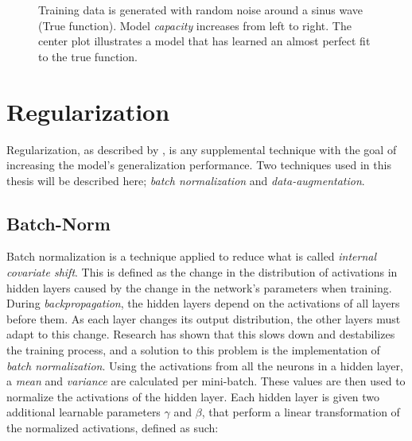         
        \begin{figure}[H]
            \centering
            
            \caption[Over/under-fit]{Training data is generated with random noise around a sinus wave (True function). Model \textit{capacity} increases from left to right. The center plot illustrates a model that has learned an almost perfect fit to the true function.}
          	\medskip 
            \label{over/under fit fig}
        \end{figure}
        
        
\section{Regularization}
    Regularization, as described by \citeauthor{kukavcka2017_regularization}\cite{kukavcka2017_regularization}, is any supplemental technique with the goal of increasing the model's generalization performance. Two techniques used in this thesis will be described here; \textit{batch normalization} and \textit{data-augmentation}.
    
\subsection{Batch-Norm}
    Batch normalization is a technique applied to reduce what is called \textit{internal covariate shift}\cite{pmlr-v37-ioffe15_batch_norm}. This is defined as the change in the distribution of activations in hidden layers caused by the change in the network's parameters when training. During \textit{backpropagation}, the hidden layers depend on the activations of all layers before them. As each layer changes its output distribution, the other layers must adapt to this change. Research has shown that this slows down and destabilizes the training process, and a solution to this problem is the implementation of \textit{batch normalization}. Using the activations from all the neurons in a hidden layer, a \textit{mean} and \textit{variance} are calculated per mini-batch. These values are then used to normalize the activations of the hidden layer. Each hidden layer is given two additional learnable parameters $\gamma$ and $\beta$, that perform a linear transformation of the normalized activations, defined as such:
    

